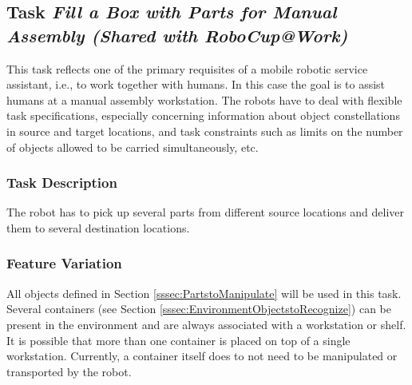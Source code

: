 

\subsection{Task \emph{Fill a Box with Parts for Manual Assembly (Shared with RoboCup@Work)}}
\label{ssec:TaskFillaBox}

This task reflects one of the primary requisites of a mobile robotic service assistant, i.e., to work together with humans. In this case the goal is to assist humans at a manual assembly workstation.
The robots have to deal with flexible task specifications, especially concerning information about object constellations in source and target locations, and task constraints such as limits on the number of objects allowed to be carried simultaneously, etc. 

\subsubsection{Task Description}
\label{sssec:TaskFillaBoxDescription}

The robot has to pick up several parts from different source locations and deliver them to several destination locations. 

\subsubsection{Feature Variation}
\label{sssec:TaskFillaBoxVariation}

All objects defined in Section \ref{sssec:PartstoManipulate} will be used in this task.
Several containers (see Section \ref{sssec:EnvironmentObjectstoRecognize}) can be present in the environment and are always associated with a workstation or shelf. It is possible that more than one container is placed on top of a single workstation. Currently, a container itself does to not need to be manipulated or transported by the robot.

